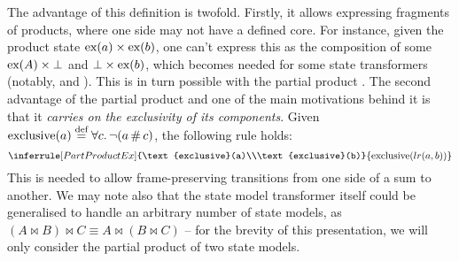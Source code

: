 The advantage of this definition is twofold. Firstly, it allows expressing fragments of products, where one side may not have a defined core. For instance, given the product state $\text{ex}(a) \times \text{ex}(b)$, one can't express this as the composition of some $\text{ex}(A) \times \bot$ and $\bot \times \text{ex}(b)$, which becomes needed for some state transformers (notably, \PMap{} and \List). This is in turn possible with the partial product . The second advantage of the partial product and one of the main motivations behind it is that it \emph{carries on the exclusivity of its components}. Given $\text{exclusive}(a) \stackrel{\textnormal{def}}= \forall c\ldotp \neg(a\operatorname{\#} c)$, the following rule holds:
\[
\inferrule[PartProductEx]
	{\text{exclusive}(a)\\\text{exclusive}(b)}
	{\text{exclusive}(lr(a, b))}
\]
This is needed to allow frame-preserving transitions from one side of a sum to another. We may note also that the state model transformer itself could be generalised to handle an arbitrary number of state models, as $(A \bowtie B) \bowtie C \equiv A \bowtie (B \bowtie C)$ -- for the brevity of this presentation, we will only consider the partial product of two state models.

